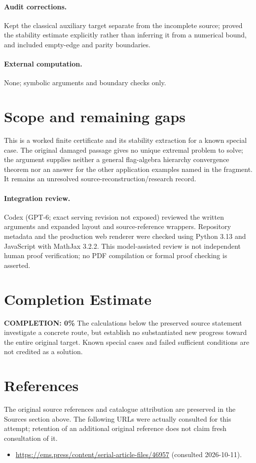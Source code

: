 \documentclass[11pt]{article}
\begin{document}
\paragraph{Audit corrections.} Kept the classical auxiliary target separate from the incomplete source;
proved the stability estimate explicitly rather than inferring it from a numerical
bound, and included empty-edge and parity boundaries.
\paragraph{External computation.} None; symbolic arguments and boundary checks only.
\section{Scope and remaining gaps}

This is a worked finite certificate and its stability extraction for a known
special case. The original damaged passage gives no unique extremal problem
to solve; the argument supplies neither a general flag-algebra hierarchy
convergence theorem nor an answer for the other application examples named in
the fragment. It remains an unresolved source-reconstruction/research record.

\paragraph{Integration review.} Codex (GPT-6; exact serving revision not exposed) reviewed the written arguments and expanded layout and source-reference wrappers. Repository metadata and the production web renderer were checked using Python 3.13 and JavaScript with MathJax 3.2.2. This model-assisted review is not independent human proof verification; no PDF compilation or formal proof checking is asserted.

\section{Completion Estimate}
\noindent\textbf{COMPLETION: 0\%}
The calculations below the preserved source statement investigate a concrete route,
but establish no substantiated new progress toward the entire original target.
Known special cases and failed sufficient conditions are not credited as a solution.
\section{References}
The original source references and catalogue attribution are preserved in the
Sources section above. The following URLs were actually consulted for this attempt;
retention of an additional original reference does not claim fresh consultation of it.
\begin{itemize}
\item \url{https://ems.press/content/serial-article-files/46957} (consulted 2026-10-11). 
\end{itemize}
\end{document}
